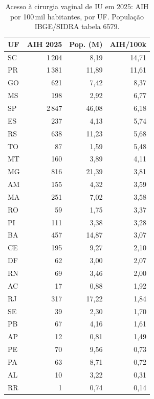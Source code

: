 \documentclass[12pt,a4paper,oneside]{article}
\begin{document}
\begin{table}[H]
\centering
\caption{Acesso à cirurgia vaginal de IU em 2025: AIH por
100\,mil habitantes, por UF. População IBGE/SIDRA tabela 6579.}
\label{tab:uf-100k}
\small
\begin{tabular}{lrrr}
\toprule
\textbf{UF} & \textbf{AIH 2025} & \textbf{Pop. (M)} & \textbf{AIH/100k} \\
\midrule
SC          & 1\,204 &  8{,}19 & 14{,}71 \\
PR          & 1\,381 & 11{,}89 & 11{,}61 \\
GO          &   621  &  7{,}42 &  8{,}37 \\
MS          &   198  &  2{,}92 &  6{,}77 \\
SP          & 2\,847 & 46{,}08 &  6{,}18 \\
ES          &   237  &  4{,}13 &  5{,}74 \\
RS          &   638  & 11{,}23 &  5{,}68 \\
TO          &    87  &  1{,}59 &  5{,}48 \\
MT          &   160  &  3{,}89 &  4{,}11 \\
MG          &   816  & 21{,}39 &  3{,}81 \\
AM          &   155  &  4{,}32 &  3{,}59 \\
MA          &   251  &  7{,}02 &  3{,}58 \\
RO          &    59  &  1{,}75 &  3{,}37 \\
PI          &   111  &  3{,}38 &  3{,}28 \\
BA          &   457  & 14{,}87 &  3{,}07 \\
CE          &   195  &  9{,}27 &  2{,}10 \\
DF          &    62  &  3{,}00 &  2{,}07 \\
RN          &    69  &  3{,}46 &  2{,}00 \\
AC          &    17  &  0{,}88 &  1{,}92 \\
RJ          &   317  & 17{,}22 &  1{,}84 \\
SE          &    39  &  2{,}30 &  1{,}70 \\
PB          &    67  &  4{,}16 &  1{,}61 \\
AP          &    12  &  0{,}81 &  1{,}49 \\
PE          &    70  &  9{,}56 &  0{,}73 \\
PA          &    63  &  8{,}71 &  0{,}72 \\
AL          &    10  &  3{,}22 &  0{,}31 \\
RR          &     1  &  0{,}74 &  0{,}14 \\
\bottomrule
\end{tabular}
\end{table}
\end{document}
